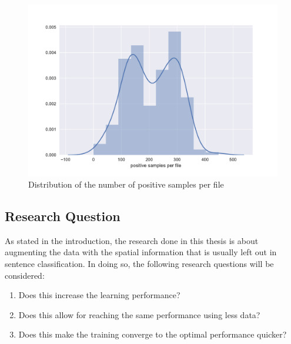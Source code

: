 \begin{figure}[htbp]
  \centering
  \includegraphics[width=\textwidth]{figures/distribution.pdf}
  \caption{Distribution of the number of positive samples per file}
  \label{fig:data_dist}
\end{figure}

\subsection{Research Question}
As stated in the introduction, the research done in this thesis is about
augmenting the data with the spatial information that is usually left out in
sentence classification. In doing so, the following research questions will be
considered:
\begin{enumerate}
\item Does this increase the learning performance?
\item Does this allow for reaching the same performance using less data?
\item Does this make the training converge to the optimal performance quicker?
\end{enumerate}

